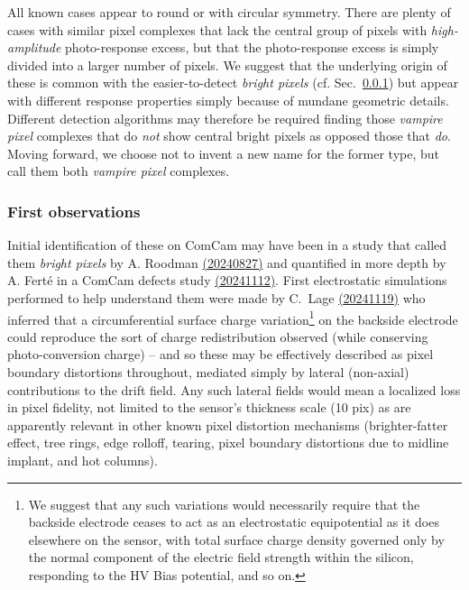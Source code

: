 All known cases appear to round or with circular symmetry. There are plenty of cases with similar pixel complexes that lack the central group of pixels with {\it high-amplitude} photo-response excess, but that the photo-response excess is simply divided into a larger number of pixels. We suggest that the underlying origin of these is common with the easier-to-detect {\it bright pixels} (cf. Sec.~\ref{first-observations}) but appear with different response properties simply because of mundane geometric details. Different detection algorithms may therefore be required finding those {\it vampire pixel} complexes that do {\it not} show central bright pixels as opposed those that {\it do}. Moving forward, we choose not to invent a new name for the former type, but call them both {\it vampire pixel} complexes.

\subsubsection{First observations}\label{first-observations}

Initial identification of these on ComCam may have been in a study that called them {\it bright pixels} by A. Roodman \href{https://confluence.slac.stanford.edu/download/attachments/209355949/Bad%20Pixels%20and%20Bright%20Spots.pdf?version=1&modificationDate=1724769154615&api=v2}{(20240827)} and quantified in more depth by A. Fert\'e in a ComCam defects study \href{https://rubin-obs.slack.com/files/U07MZAE6V3P/F080JU4CH8A/isr_science_unit_meeting__11_12_2024_-_vampire_pixels.pdf}{(20241112)}. First electrostatic simulations performed to help understand them were made by C.~Lage \href{https://confluence.slac.stanford.edu/download/attachments/209355949/Vampire_Pixel_Simulations_18Nov24.pdf?version=1&modificationDate=1731964502136&api=v2}{(20241119)} who inferred that a circumferential surface charge variation\footnote{We suggest that any such variations would necessarily require that the backside electrode ceases to act as an electrostatic equipotential as it does elsewhere on the sensor, with total surface charge density governed only by the normal component of the electric field strength within the silicon, responding to the HV Bias potential, and so on.} 
on the backside electrode could reproduce the sort of charge redistribution observed (while conserving photo-conversion charge) -- and so these may be effectively described as pixel boundary distortions throughout, mediated simply by lateral (non-axial) contributions to the drift field. Any such lateral fields would mean a localized loss in pixel fidelity, not limited to the sensor's thickness scale (10 pix) as are apparently relevant in other known pixel distortion mechanisms (brighter-fatter effect, tree rings, edge rolloff, tearing, pixel boundary distortions due to midline implant, and hot columns).

